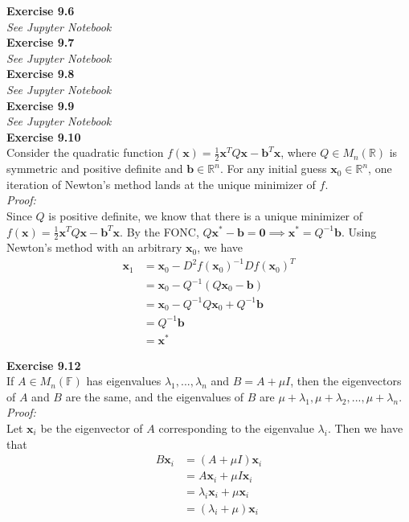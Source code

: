 \documentclass[letterpaper,12pt]{article}
\let\vec\mathbf
\theoremstyle{definition}
\begin{document}
\textbf{Exercise 9.6} \\
\textit{See Jupyter Notebook} \\

\textbf{Exercise 9.7} \\
\textit{See Jupyter Notebook} \\

\textbf{Exercise 9.8} \\
\textit{See Jupyter Notebook} \\

\textbf{Exercise 9.9} \\
\textit{See Jupyter Notebook} \\

\textbf{Exercise 9.10} \\
Consider the quadratic function $f(\vec{x})=\frac{1}{2}\vec{x}^TQ\vec{x} - \vec{b}^T\vec{x}$, where $Q \in M_n(\mathbb{R})$ is symmetric and positive definite and $\vec{b} \in \mathbb{R}^n$. For any initial guess $\vec{x}_0 \in \mathbb{R}^n$, one iteration of Newton's method lands at the unique minimizer of $f$. \\
\textit{Proof:} \\
Since $Q$ is positive definite, we know that there is a unique minimizer of $f(\vec{x})=\frac{1}{2}\vec{x}^TQ\vec{x} - \vec{b}^T\vec{x}$. By the FONC, $Q\vec{x}^* - \vec{b} = \vec{0} \implies \vec{x}^* = Q^{-1}\vec{b}$. Using Newton's method with an arbitrary $\vec{x}_0$, we have
\begin{align*}
  \vec{x}_1 &= \vec{x}_0 - D^2f(\vec{x}_0)^{-1}Df(\vec{x}_0)^T
  \\
  &= \vec{x}_0 - Q^{-1}(Q\vec{x}_0 - \vec{b})
  \\
  &= \vec{x}_0 - Q^{-1}Q\vec{x}_0 + Q^{-1}\vec{b}
  \\
  &= Q^{-1}\vec{b}
  \\
  &= \vec{x}^*
\end{align*}

\textbf{Exercise 9.12} \\
If $A \in M_n(\mathbb{F})$ has eigenvalues $\lambda_1, ..., \lambda_n$ and $B = A + \mu I$, then the eigenvectors of $A$ and $B$ are the same, and the eigenvalues of $B$ are $\mu + \lambda_1, \mu + \lambda_2, ..., \mu + \lambda_n$. \\
\textit{Proof:} \\
Let $\vec{x}_i$ be the eigenvector of $A$ corresponding to the eigenvalue $\lambda_i$. Then we have that
\begin{align*}
  B\vec{x}_i &= (A+\mu I)\vec{x}_i \\
  &= A\vec{x}_i + \mu I\vec{x}_i \\
  &= \lambda_i\vec{x}_i + \mu\vec{x}_i \\
  &= (\lambda_i + \mu)\vec{x}_i
\end{align*}
\end{document}
